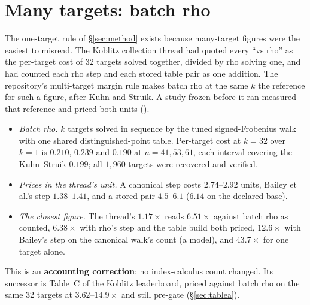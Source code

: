 \section{Many targets: batch rho}\label{sec:rv-batch}

The one-target rule of \S\ref{sec:method} exists because many-target
figures were the easiest to misread. The Koblitz collection thread had
quoted every ``vs rho'' as the per-target cost of 32 targets solved
together, divided by rho solving one, and had counted each rho step and
each stored table pair as one addition. The repository's multi-target
margin rule makes batch rho at the same $k$ the reference for such a
figure, after Kuhn and Struik. A study frozen before it ran measured that
reference and priced both units ().
\begin{itemize}
\item \emph{Batch rho.} $k$ targets solved in sequence by the tuned
  signed-Frobenius walk with one shared distinguished-point table. Per-target
  cost at $k=32$ over $k=1$ is $0.210$, $0.239$ and $0.190$ at $n=41,53,61$,
  each interval covering the Kuhn--Struik $0.199$; all $1{,}960$ targets
  were recovered and verified.
\item \emph{Prices in the thread's unit.} A canonical step costs
  $2.74$--$2.92$ units, Bailey et al.'s step $1.38$--$1.41$, and a stored pair
  $4.5$--$6.1$ ($6.14$ on the declared base).
\item \emph{The closest figure.} The thread's $1.17\times$ reads
  $6.51\times$ against batch rho as counted, $6.38\times$ with rho's step and
  the table build both priced, $12.6\times$ with Bailey's step on the
  canonical walk's count (a model), and $43.7\times$ for one target alone.
\end{itemize}
This is an \textbf{accounting correction}: no index-calculus count changed.
Its successor is Table~C of the Koblitz leaderboard, priced against batch
rho on the same 32 targets at $3.62$--$14.9\times$ and still pre-gate
(\S\ref{sec:tablea}).

